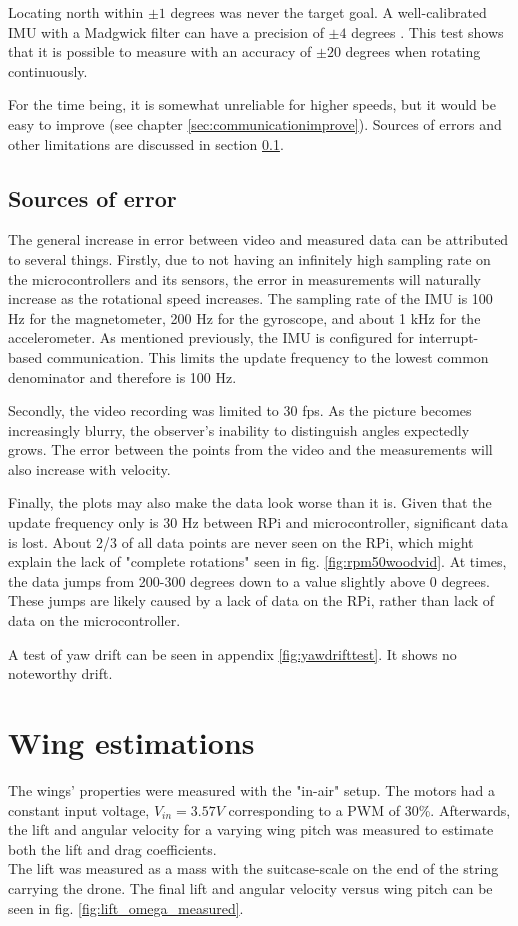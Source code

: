 Locating north within $\pm 1$ degrees was never the target goal. A well-calibrated IMU with a Madgwick filter can have a precision of $\pm 4$ degrees \cite{FilterFusionPrecision}. This test shows that it is possible to measure with an accuracy of $\pm 20$ degrees when rotating continuously.  

For the time being, it is somewhat unreliable for higher speeds, but it would be easy to improve (see chapter \ref{sec:communicationimprove}).
Sources of errors and other limitations are discussed in section \ref{error_measurementprecision}.



\subsection{Sources of error} \label{error_measurementprecision}
The general increase in error between video and measured data can be attributed to several things. 
Firstly, due to not having an infinitely high sampling rate on the microcontrollers and its sensors, the error in measurements will naturally increase as the rotational speed increases. 
The sampling rate of the IMU is 100 Hz for the magnetometer, 200 Hz for the gyroscope, and about 1 kHz for the accelerometer. As mentioned previously, the IMU is configured for interrupt-based communication. This limits the update frequency to the lowest common denominator and therefore is 100 Hz. 

Secondly, the video recording was limited to 30 fps. As the picture becomes increasingly blurry, the observer's inability to distinguish angles expectedly grows. The error between the points from the video and the measurements will also increase with velocity. 

Finally, the plots may also make the data look worse than it is. Given that the update frequency only is 30 Hz between RPi and microcontroller, significant data is lost. About 2/3 of all data points are never seen on the RPi, which might explain the lack of "complete rotations" seen in fig. \ref{fig:rpm50woodvid}. At times, the data jumps from 200-300 degrees down to a value slightly above 0 degrees. These jumps are  likely caused by a lack of data on the RPi, rather than lack of data on the microcontroller.

A test of yaw drift can be seen in appendix \ref{fig:yawdrifttest}. It shows no noteworthy drift. 


\section{Wing estimations} \label{chap:wing_est}
The wings' properties were measured with the "in-air" setup. The motors had a constant input voltage, $V_{in} = 3.57 V$ corresponding to a PWM of 30\%. Afterwards, the lift and angular velocity for a varying wing pitch was measured to estimate both the lift and drag coefficients.\\
The lift was measured as a mass with the suitcase-scale on the end of the string carrying the drone. The final lift and angular velocity versus wing pitch can be seen in fig. \ref{fig:lift_omega_measured}.

